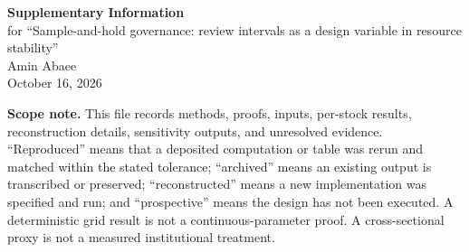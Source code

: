 \documentclass[10pt]{article}
\begin{document}
\begin{center}
{\LARGE\bfseries Supplementary Information}\\[0.7em]
{\large for ``Sample-and-hold governance: review intervals as a design variable in resource stability''}\\[0.4em]
Amin Abaee\\
October 16, 2026
\end{center}
\vspace{0.5em}
\noindent\textbf{Scope note.} This file records methods, proofs, inputs, per-stock results, reconstruction details, sensitivity outputs, and unresolved evidence. ``Reproduced'' means that a deposited computation or table was rerun and matched within the stated tolerance; ``archived'' means an existing output is transcribed or preserved; ``reconstructed'' means a new implementation was specified and run; and ``prospective'' means the design has not been executed. A deterministic grid result is not a continuous-parameter proof. A cross-sectional proxy is not a measured institutional treatment.

\tableofcontents
\newpage
\end{document}
